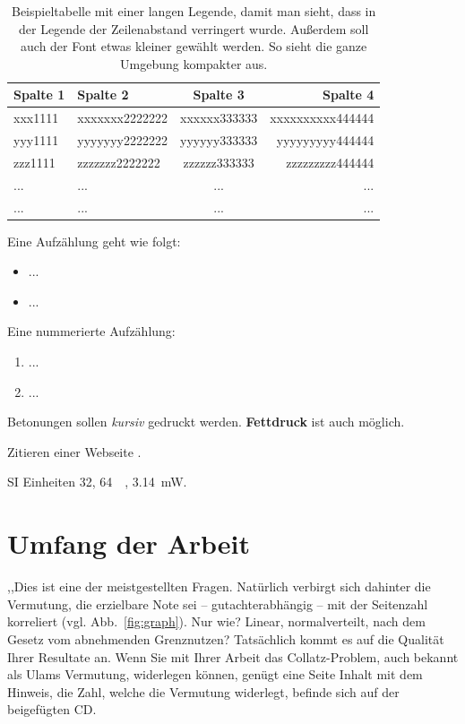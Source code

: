 \begin{table}[htb]
  \centering
  \begin{tabular}{p{2.7cm}lcr}
    \toprule
    \textbf{Spalte 1} 
    & \textbf{Spalte 2} 
    & \textbf{Spalte 3} 
    & \textbf{Spalte 4} \\
    \midrule
    xxx1111
    & xxxxxxx2222222
    & xxxxxx333333 
    & xxxxxxxxxx444444 \\

    yyy1111
    & yyyyyyy2222222
    & yyyyyy333333 
    & yyyyyyyyy444444 \\
    \addlinespace 

    zzz1111
    & zzzzzzz2222222
    & zzzzzz333333 
    & zzzzzzzzz444444 \\

    ...
    & ...
    & ...
    & ...\\
    ...
    & ...
    & ...
    & ...\\
    \bottomrule
  \end{tabular}
  \caption[Beispieltabelle mit langer Legende]{Beispieltabelle mit einer langen Legende, damit man sieht, dass in der Legende der Zeilenabstand verringert wurde. Außerdem soll auch der Font etwas kleiner gewählt werden. So sieht die ganze Umgebung kompakter aus.}
  \label{tab:tabelle_1}
\end{table}

Eine Aufzählung geht wie folgt:
\begin{itemize}
	\item ...
	\item ...
\end{itemize}
Eine nummerierte Aufzählung:
\begin{enumerate}
	\item ...
	\item ...
\end{enumerate}

Betonungen sollen \emph{kursiv} gedruckt werden. 
\textbf{Fettdruck} ist auch möglich.

Zitieren einer Webseite \cite{webpage}.

SI Einheiten \SI{32}{\bit}, \SI{64}{\kilo\byte}, \SI{3.14}{\milli\watt}.

\section{Umfang der Arbeit}
,,Dies ist eine der meistgestellten Fragen. Natürlich verbirgt sich dahinter die Vermutung, die erzielbare Note sei – gutachterabhängig – mit der Seitenzahl korreliert (vgl. Abb.~\ref{fig:graph}). Nur
wie? Linear, normalverteilt, nach dem Gesetz vom abnehmenden Grenznutzen?
Tatsächlich kommt es auf die Qualität Ihrer Resultate an. Wenn Sie mit Ihrer Arbeit das Collatz-Problem, auch bekannt als Ulams Vermutung, widerlegen können, genügt eine Seite Inhalt mit dem Hinweis, die Zahl, welche die Vermutung widerlegt, befinde sich auf der beigefügten CD.

